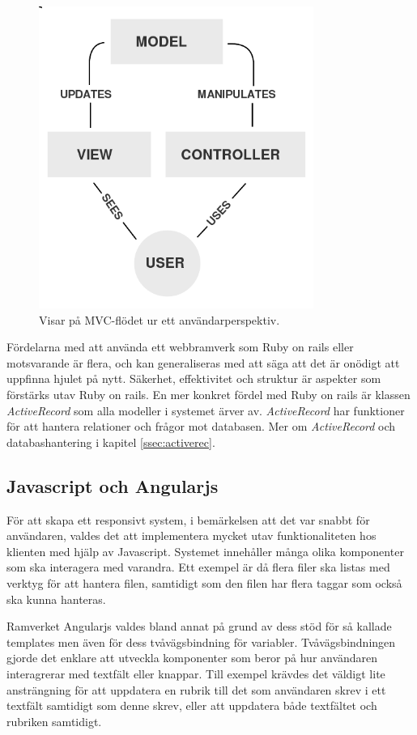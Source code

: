 \begin{figure}[!H]
\centering
\includegraphics[width=0.8\textwidth]{figures/MVC_wiki.png}
\caption{Visar på MVC-flödet ur ett användarperspektiv.}
\label{fig:mvc2}
\end{figure}

Fördelarna med att använda ett webbramverk som Ruby on rails eller motsvarande är flera, och kan generaliseras med att säga att det är onödigt att uppfinna hjulet på nytt. Säkerhet, effektivitet och struktur är aspekter som förstärks utav Ruby on rails. En mer konkret fördel med Ruby on rails är klassen \emph{ActiveRecord} som alla modeller i systemet ärver av. \emph{ActiveRecord} har funktioner för att hantera relationer och frågor mot databasen. Mer om \emph{ActiveRecord} och databashantering i kapitel \ref{ssec:activerec}.

\subsection{Javascript och Angularjs}
För att skapa ett responsivt system, i bemärkelsen att det var snabbt för användaren, valdes det att implementera mycket utav funktionaliteten hos klienten med hjälp av Javascript. Systemet innehåller många olika komponenter som ska interagera med varandra. Ett exempel är då flera filer ska listas med verktyg för att hantera filen, samtidigt som den filen har flera taggar som också ska kunna hanteras.

Ramverket Angularjs valdes bland annat på grund av dess stöd för så kallade templates men även för dess tvåvägsbindning för variabler. Tvåvägsbindningen gjorde det enklare att utveckla komponenter som beror på hur användaren interagrerar med textfält eller knappar. Till exempel krävdes det väldigt lite ansträngning för att uppdatera en rubrik till det som användaren skrev i ett textfält samtidigt som denne skrev, eller att uppdatera både textfältet och rubriken samtidigt.

